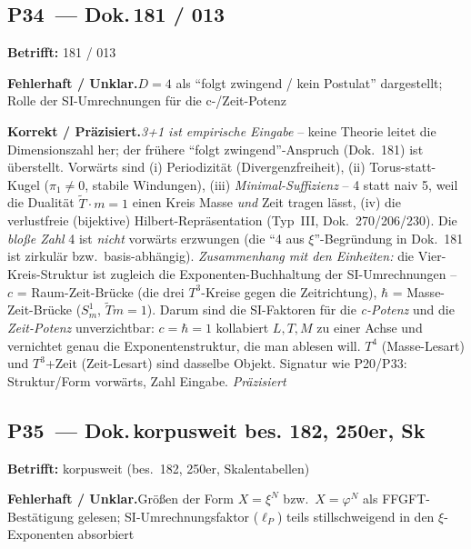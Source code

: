 \medskip


\subsection*{P34~--- Dok.\,181 / 013}

\noindent\textbf{Betrifft:} 181 / 013


\smallskip\noindent\textbf{Fehlerhaft / Unklar.}\quad $D=4$ als \enquote{folgt zwingend / kein Postulat} dargestellt; Rolle der SI-Umrechnungen für die c-/Zeit-Potenz


\smallskip\noindent\textbf{Korrekt / Präzisiert.}\quad \emph{3+1 ist empirische Eingabe} -- keine Theorie leitet die Dimensionszahl her; der frühere \enquote{folgt zwingend}-Anspruch (Dok.~181) ist überstellt. Vorwärts sind (i) Periodizität (Divergenzfreiheit), (ii) Torus-statt-Kugel ($\pi_1\neq0$, stabile Windungen), (iii) \emph{Minimal-Suffizienz} -- 4 statt naiv 5, weil die Dualität $\tilde T\cdot m=1$ einen Kreis Masse \emph{und} Zeit tragen lässt, (iv) die verlustfreie (bijektive) Hilbert-Repräsentation (Typ~III, Dok.~270/206/230). Die \emph{bloße Zahl} 4 ist \emph{nicht} vorwärts erzwungen (die \enquote{4 aus $\xi$}-Begründung in Dok.~181 ist zirkulär bzw.\ basis-abhängig). \emph{Zusammenhang mit den Einheiten:} die Vier-Kreis-Struktur ist zugleich die Exponenten-Buchhaltung der SI-Umrechnungen -- $c$ = Raum-Zeit-Brücke (die drei $T^3$-Kreise gegen die Zeitrichtung), $\hbar$ = Masse-Zeit-Brücke ($S^1_m$, $\tilde T m=1$). Darum sind die SI-Faktoren für die \emph{c-Potenz} und die \emph{Zeit-Potenz} unverzichtbar: $c=\hbar=1$ kollabiert $L,T,M$ zu einer Achse und vernichtet genau die Exponentenstruktur, die man ablesen will. $T^4$ (Masse-Lesart) und $T^3$+Zeit (Zeit-Lesart) sind dasselbe Objekt. Signatur wie P20/P33: Struktur/Form vorwärts, Zahl Eingabe. \emph{Präzisiert}


\medskip


\subsection*{P35~--- Dok.\,korpusweit bes. 182, 250er, Sk}

\noindent\textbf{Betrifft:} korpusweit (bes.\ 182, 250er, Skalentabellen)


\smallskip\noindent\textbf{Fehlerhaft / Unklar.}\quad Größen der Form $X = \xi^N$ bzw.\ $X = \varphi^N$ als FFGFT-Bestätigung gelesen; SI-Umrechnungsfaktor ($\ell_P$) teils stillschweigend in den $\xi$-Exponenten absorbiert


